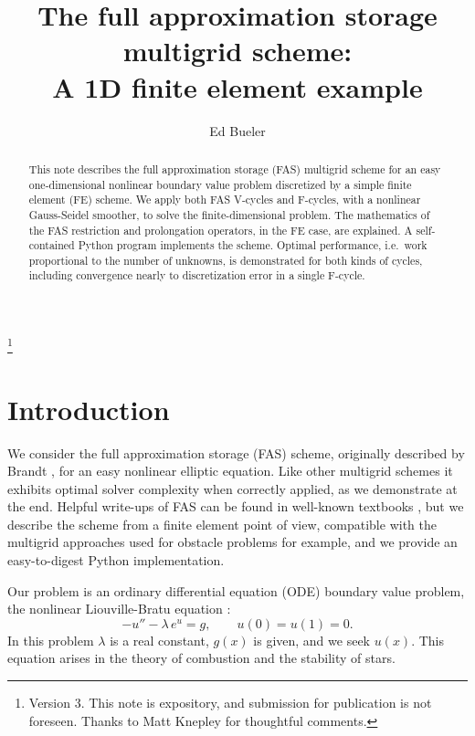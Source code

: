 \documentclass[letterpaper,final,12pt,reqno]{amsart}
\begin{document}
\title[The FAS multigrid scheme]{The full approximation storage multigrid scheme: \\ A 1D finite element example}

\author{Ed Bueler}

\begin{abstract}  This note describes the full approximation storage (FAS) multigrid scheme for an easy one-dimensional nonlinear boundary value problem discretized by a simple finite element (FE) scheme.  We apply both FAS V-cycles and F-cycles, with a nonlinear Gauss-Seidel smoother, to solve the finite-dimensional problem.  The mathematics of the FAS restriction and prolongation operators, in the FE case, are explained.  A self-contained Python program implements the scheme.  Optimal performance, i.e.~work proportional to the number of unknowns, is demonstrated for both kinds of cycles, including convergence nearly to discretization error in a single F-cycle.  \end{abstract}

\thanks{Version 3.  This note is expository, and submission for publication is not foreseen.  Thanks to Matt Knepley for thoughtful comments.}

\maketitle

\tableofcontents

\thispagestyle{empty}

\section{Introduction}  \label{sec:intro}

We consider the full approximation storage (FAS) scheme, originally described by Brandt \cite{Brandt1977}, for an easy nonlinear elliptic equation.  Like other multigrid schemes it exhibits optimal solver complexity \cite{Bueler2021} when correctly applied, as we demonstrate at the end.  Helpful write-ups of FAS can be found in well-known textbooks \cite{BrandtLivne2011,Briggsetal2000,Trottenbergetal2001}, but we describe the scheme from a finite element point of view, compatible with the multigrid approaches used for obstacle problems \cite{GraeserKornhuber2009} for example, and we provide an easy-to-digest Python implementation.

Our problem is an ordinary differential equation (ODE) boundary value problem, the nonlinear Liouville-Bratu equation \cite{Bratu1914,Liouville1853}:
\begin{equation}
  -u'' - \lambda\, e^u = g,  \qquad u(0) = u(1) = 0.  \label{liouvillebratu}
\end{equation}
In this problem $\lambda$ is a real constant, $g(x)$ is given, and we seek $u(x)$.  This equation arises in the theory of combustion \cite{FrankKameneckij1955} and the stability of stars.
\end{document}
